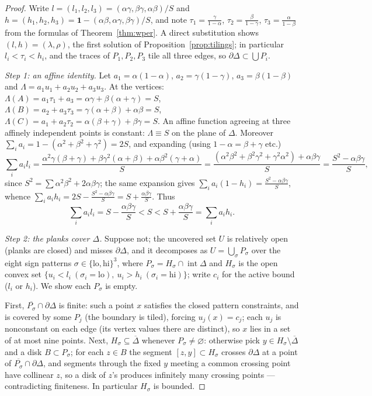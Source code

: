 \documentclass[11pt,reqno]{amsart}
\theoremstyle{plain}
\theoremstyle{definition}
\theoremstyle{remark}
\begin{document}
\begin{proof}
Write $l=(l_1,l_2,l_3)=(\alpha\gamma,\beta\gamma,\alpha\beta)/S$ and
$h=(h_1,h_2,h_3)=\mathbf1-(\alpha\beta,\alpha\gamma,\beta\gamma)/S$, and note
$\tau_1=\frac{\gamma}{1-\alpha}$, $\tau_2=\frac{\beta}{1-\gamma}$,
$\tau_3=\frac{\alpha}{1-\beta}$ from the formulas of Theorem~\ref{thm:wper}. A
direct substitution shows $(l,h)=(\lambda,\rho)$, the first solution of
Proposition~\ref{prop:tilings}; in particular $l_i<\tau_i<h_i$, and the traces
of $P_1,P_2,P_3$ tile all three edges, so $\partial\Delta\subset\bigcup P_i$.

\emph{Step 1: an affine identity.} Let $a_1=\alpha(1-\alpha)$,
$a_2=\gamma(1-\gamma)$, $a_3=\beta(1-\beta)$ and
$\Lambda=a_1u_1+a_2u_2+a_3u_3$. At the vertices:
$\Lambda(A)=a_1\tau_1+a_3=\alpha\gamma+\beta(\alpha+\gamma)=S$,
$\Lambda(B)=a_2+a_3\tau_3=\gamma(\alpha+\beta)+\alpha\beta=S$,
$\Lambda(C)=a_1+a_2\tau_2=\alpha(\beta+\gamma)+\beta\gamma=S$. An affine
function agreeing at three affinely independent points is constant:
$\Lambda\equiv S$ on the plane of $\Delta$. Moreover
$\sum_ia_i=1-(\alpha^2+\beta^2+\gamma^2)=2S$, and expanding (using
$1-\alpha=\beta+\gamma$ etc.)
\[
\textstyle\sum_i a_il_i
=\frac{\alpha^2\gamma(\beta+\gamma)+\beta\gamma^2(\alpha+\beta)
+\alpha\beta^2(\gamma+\alpha)}{S}
=\frac{(\alpha^2\beta^2+\beta^2\gamma^2+\gamma^2\alpha^2)+\alpha\beta\gamma}{S}
=\frac{S^2-\alpha\beta\gamma}{S},
\]
since $S^2=\sum\alpha^2\beta^2+2\alpha\beta\gamma$; the same expansion gives
$\sum_ia_i(1-h_i)=\frac{S^2-\alpha\beta\gamma}S$, whence
$\sum_ia_ih_i=2S-\frac{S^2-\alpha\beta\gamma}S=S+\frac{\alpha\beta\gamma}S$.
Thus
\begin{equation}\label{eq:margin}
\textstyle\sum_i a_il_i=S-\frac{\alpha\beta\gamma}S<S<
S+\frac{\alpha\beta\gamma}S=\sum_i a_ih_i .
\end{equation}

\emph{Step 2: the planks cover $\Delta$.} Suppose not; the uncovered set $U$ is
relatively open (planks are closed) and misses $\partial\Delta$, and it
decomposes as $U=\bigcup_\sigma P_\sigma$ over the eight sign patterns
$\sigma\in\{\mathrm{lo},\mathrm{hi}\}^3$, where $P_\sigma=H_\sigma\cap
\operatorname{int}\Delta$ and $H_\sigma$ is the open convex set
$\{u_i<l_i\ (\sigma_i=\mathrm{lo}),\ u_i>h_i\ (\sigma_i=\mathrm{hi})\}$; write
$c_i$ for the active bound ($l_i$ or $h_i$). We show each $P_\sigma$ is empty.

First, $\overline{P_\sigma}\cap\partial\Delta$ is finite: such a point $x$
satisfies the closed pattern constraints, and is covered by some $P_j$ (the
boundary is tiled), forcing $u_j(x)=c_j$; each $u_j$ is nonconstant on each
edge (its vertex values there are distinct), so $x$ lies in a set of at most
nine points. Next, $H_\sigma\subseteq\overline\Delta$ whenever
$P_\sigma\ne\varnothing$: otherwise pick $y\in H_\sigma\setminus\overline\Delta$
and a disk $B\subset P_\sigma$; for each $z\in B$ the segment $[z,y]\subset
H_\sigma$ crosses $\partial\Delta$ at a point of
$\overline{P_\sigma}\cap\partial\Delta$, and segments through the fixed $y$
meeting a common crossing point have collinear $z$, so a disk of $z$'s produces
infinitely many crossing points --- contradicting finiteness. In particular
$H_\sigma$ is bounded.


\end{proof}
\end{document}
